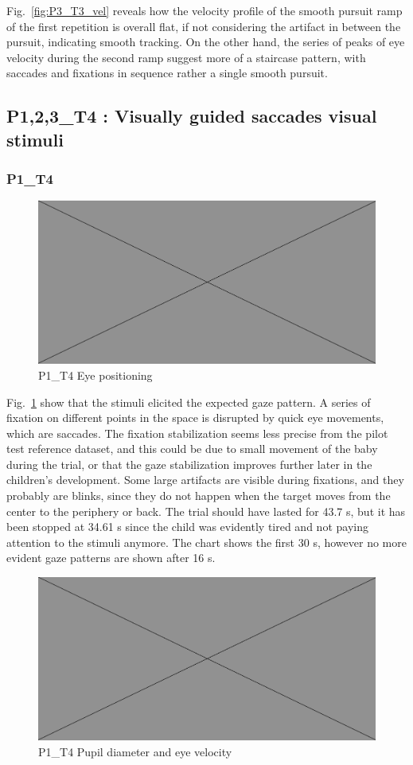 Fig.~\ref{fig:P3_T3_vel} reveals how the velocity profile of the smooth pursuit ramp of the first repetition is overall flat, if not considering the artifact in between the pursuit, indicating smooth tracking. On the other hand, the series of peaks of eye velocity during the second ramp suggest more of a staircase pattern, with saccades and fixations in sequence rather a single smooth pursuit.

\subsection{P{1,2,3}\_T4 : Visually guided saccades visual stimuli}
\label{sec:P123_T4}


\subsubsection{P1\_T4}
\label{sec:P1_T1}

\begin{figure}[h]
  \centering
  \includegraphics[width=.5\textwidth]{figures/placeholderImg.jpg}
  \caption[P1\_T4 Eye positioning]{P1\_T4 Eye positioning}
  \label{fig:P1_T4_pos}
\end{figure}

Fig.~\ref{fig:P1_T4_pos} show that the stimuli elicited the expected gaze pattern. A series of fixation on different points in the space is disrupted by quick eye movements, which are saccades. The fixation stabilization seems less precise from the pilot test reference dataset, and this could be due to small movement of the baby during the trial, or that the gaze stabilization improves further later in the children’s development. Some large artifacts are visible during fixations, and they probably are blinks, since they do not happen when the target moves from the center to the periphery or back.
The trial should have lasted for 43.7 s, but it has been stopped at 34.61 s since the child was evidently tired and not paying attention to the stimuli anymore. The chart shows the first 30 s, however no more evident gaze patterns are shown after 16 s.

\begin{figure}[h]
  \centering
  \includegraphics[width=.5\textwidth]{figures/placeholderImg.jpg}
  \caption[P1\_T4 pupil velocity]{P1\_T4 Pupil diameter and eye velocity}
  \label{fig:P1_T4_vel}
\end{figure}


